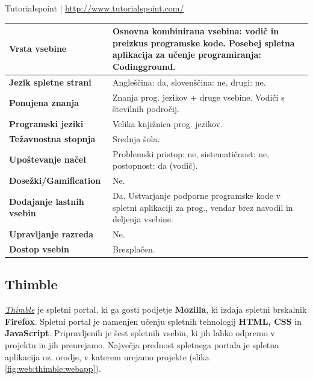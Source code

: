 \begin{osebnabox}[label={osebna:tutorails point}]{Tutorialspoint |
    \url{http://www.tutorialspoint.com/}}
    \begin{tabular}{
  p{} |
  p{}  }
  \textbf{Vrsta vsebine} & Osnovna kombinirana vsebina: vodič in
                           preizkus programske kode. Posebej spletna
                           aplikacija za učenje programiranja:
                           Codingground. \\
      \hline
  \textbf{Jezik spletne strani} & Angleščina: da, slovenščina: ne,
                                  drugi: ne. \\
      \hline
  \textbf{Ponujena znanja} & Znanja prog. jezikov + druge
                             vsebine. Vodiči s številnih področij. \\
      \hline
 \textbf{Programski jeziki} & Velika knjižnica prog. jezikov. \\
      \hline
  \textbf{Težavnostna stopnja} & Srednja šola.\\
      \hline
   \textbf{Upoštevanje načel} & Problemski pristop: ne,
                                sistematičnost: ne, postopnost: da (vodič). \\
      \hline
  \textbf{Dosežki/Gamification} & Ne. \\
      \hline
  \textbf{Dodajanje lastnih vsebin} & Da. Ustvarjanje podporne
                                      programske kode v spletni
                                      aplikaciji za prog., vendar brez
                                      navodil in deljenja vsebine.  \\
      \hline
  \textbf{Upravljanje razreda} & Ne. \\
      \hline
  \textbf{Dostop vsebin} & Brezplačen. \\

\end{tabular}
\end{osebnabox}

\subsection{Thimble}
\label{sec:thimble}


\emph{\href{https://thimble.mozilla.org/sl/}{Thimble}}
\cite{web:thimble} je spletni portal, ki ga gosti podjetje
\textbf{Mozilla}, ki izdaja spletni brskalnik
\textbf{Firefox}. Spletni portal je namenjen učenju spletnih
tehnologij \textbf{HTML, CSS} in \textbf{JavaScript}. Pripravljenih
je šest spletnih vsebin, ki jih lahko odpremo v projektu in jih
preurejamo. Največja prednost spletnega portala je spletna aplikacija
oz. orodje, v katerem urejamo projekte (slika
\ref{fig:web:thimble:webapp}).

